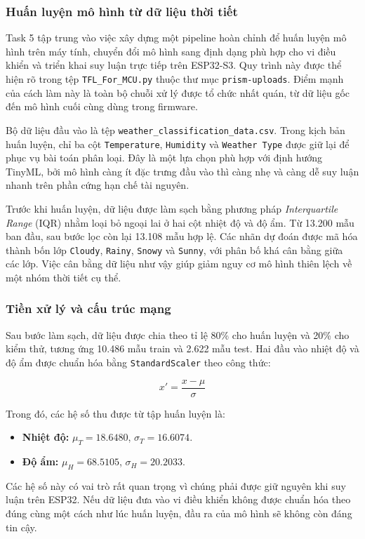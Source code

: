 \subsubsection{Huấn luyện mô hình từ dữ liệu thời tiết}
Task 5 tập trung vào việc xây dựng một pipeline hoàn chỉnh để huấn luyện mô hình trên máy tính, chuyển đổi mô hình sang định dạng phù hợp cho vi điều khiển và triển khai suy luận trực tiếp trên ESP32-S3. Quy trình này được thể hiện rõ trong tệp \texttt{TFL\_For\_MCU.py} thuộc thư mục \texttt{prism-uploads}. Điểm mạnh của cách làm này là toàn bộ chuỗi xử lý được tổ chức nhất quán, từ dữ liệu gốc đến mô hình cuối cùng dùng trong firmware.

Bộ dữ liệu đầu vào là tệp \texttt{weather\_classification\_data.csv}. Trong kịch bản huấn luyện, chỉ ba cột \texttt{Temperature}, \texttt{Humidity} và \texttt{Weather Type} được giữ lại để phục vụ bài toán phân loại. Đây là một lựa chọn phù hợp với định hướng TinyML, bởi mô hình càng ít đặc trưng đầu vào thì càng nhẹ và càng dễ suy luận nhanh trên phần cứng hạn chế tài nguyên.

Trước khi huấn luyện, dữ liệu được làm sạch bằng phương pháp \textit{Interquartile Range} (IQR) nhằm loại bỏ ngoại lai ở hai cột nhiệt độ và độ ẩm. Từ 13.200 mẫu ban đầu, sau bước lọc còn lại 13.108 mẫu hợp lệ. Các nhãn dự đoán được mã hóa thành bốn lớp \texttt{Cloudy}, \texttt{Rainy}, \texttt{Snowy} và \texttt{Sunny}, với phân bố khá cân bằng giữa các lớp. Việc cân bằng dữ liệu như vậy giúp giảm nguy cơ mô hình thiên lệch về một nhóm thời tiết cụ thể.

\subsubsection{Tiền xử lý và cấu trúc mạng}
Sau bước làm sạch, dữ liệu được chia theo tỉ lệ 80\% cho huấn luyện và 20\% cho kiểm thử, tương ứng 10.486 mẫu train và 2.622 mẫu test. Hai đầu vào nhiệt độ và độ ẩm được chuẩn hóa bằng \texttt{StandardScaler} theo công thức:

\[
x' = \frac{x - \mu}{\sigma}
\]

Trong đó, các hệ số thu được từ tập huấn luyện là:
\begin{itemize}
    \item \textbf{Nhiệt độ:} $\mu_T = 18.6480$, $\sigma_T = 16.6074$.
    \item \textbf{Độ ẩm:} $\mu_H = 68.5105$, $\sigma_H = 20.2033$.
\end{itemize}

Các hệ số này có vai trò rất quan trọng vì chúng phải được giữ nguyên khi suy luận trên ESP32. Nếu dữ liệu đưa vào vi điều khiển không được chuẩn hóa theo đúng cùng một cách như lúc huấn luyện, đầu ra của mô hình sẽ không còn đáng tin cậy.

